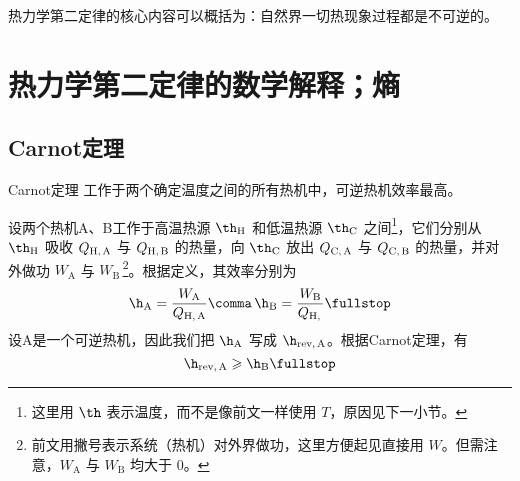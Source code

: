     热力学第二定律的核心内容可以概括为：自然界一切热现象过程都是不可逆的。
    
\section{热力学第二定律的数学解释；熵}
  \subsection{Carnot定理}
    \begin{myThm}{Carnot定理}
      工作于两个确定温度之间的所有热机中，可逆热机效率最高。
    \end{myThm}
    
    设两个热机A、B工作于高温热源 $\th_\text{H}$ 和低温热源 $\th_\text{C}$ 之间\footnote{
      这里用 $\th$ 表示温度，而不是像前文一样使用 $T$，原因见下一小节。
    }，它们分别从 $\th_\text{H}$ 吸收 $Q_\text{H,\,A}$ 与 $Q_\text{H,\,B}$ 的热量，向 $\th_\text{C}$ 放出 $Q_\text{C,\,A}$ 与 $Q_\text{C,\,B}$ 的热量，并对外做功 $W_\text{A}$ 与 $W_\text{B} \,$\footnote{
      前文用撇号表示系统（热机）对外界做功，这里方便起见直接用 $W$。但需注意，$W_\text{A}$ 与 $W_\text{B}$ 均大于 $0$。
    }。根据定义，其效率分别为
    \begin{equation}
      \h_\text{A} = \frac{W_\text{A}}{Q_\text{H,\,A}} \comma \, \h_\text{B} = \frac{W_\text{B}}{Q_\text{H,\,}} \fullstop
    \end{equation}
    设A是一个可逆热机，因此我们把 $\h_\text{A}$ 写成 $\h_\text{rev,\,A}$。根据Carnot定理，有
    \begin{equation}
      \h_\text{rev,\,A} \geqslant \h_\text{B} \fullstop
    \end{equation}
    
